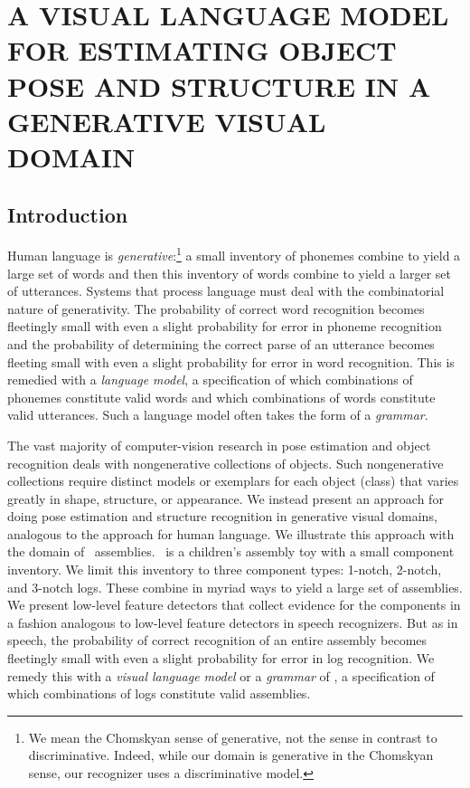 \chapter{A VISUAL LANGUAGE MODEL FOR ESTIMATING OBJECT POSE AND STRUCTURE IN A GENERATIVE VISUAL DOMAIN}
\label{chapter:icra2011}

\section{Introduction}
\label{sec-ll1:introduction}

Human language is \emph{generative}:\footnote{We mean the Chomskyan sense of
  generative, not the sense in contrast to discriminative.
%
Indeed, while our domain is generative in the Chomskyan sense, our recognizer
uses a discriminative model.}  a small inventory of phonemes combine to yield a
large set of words and then this inventory of words combine to yield a larger
set of utterances.
%
Systems that process language must deal with the combinatorial nature of
generativity.
%
The probability of correct word recognition becomes fleetingly small with even
a slight probability for error in phoneme recognition and the probability of
determining the correct parse of an utterance becomes fleeting small with even
a slight probability for error in word recognition.
%
This is remedied with a \emph{language model}, a specification of which
combinations of phonemes constitute valid words and which combinations of
words constitute valid utterances.
%
Such a language model often takes the form of a \emph{grammar}.

The vast majority of computer-vision research in pose estimation and object
recognition deals with nongenerative collections of objects.
%
Such nongenerative collections require distinct models or exemplars for each
object (class) that varies greatly in shape, structure, or appearance.
%
We instead present an approach for doing pose estimation and structure
recognition in generative visual domains, analogous to the approach for human
language.
%
We illustrate this approach with the domain of \LincolnLog\ assemblies.
%
\LincolnLogs\ is a children's assembly toy with a small component inventory.
%
We limit this inventory to three component types: 1-notch, 2-notch, and 3-notch
logs.
%
These combine in myriad ways to yield a large set of assemblies.
%
We present low-level feature detectors that collect evidence for the components
in a fashion analogous to low-level feature detectors in speech recognizers.
%
But as in speech, the probability of correct recognition of an entire assembly
becomes fleetingly small with even a slight probability for error in log
recognition.
%
We remedy this with a \emph{visual language model} or a \emph{grammar} of
\LincolnLogs, a specification of which combinations of logs constitute valid
assemblies.

